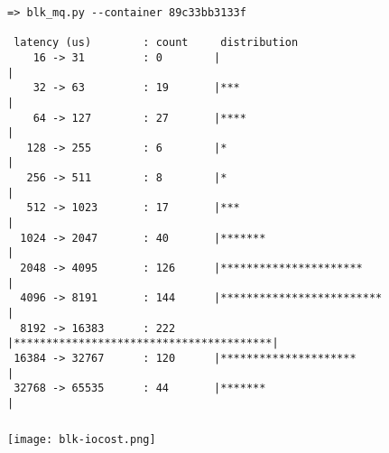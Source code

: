 \documentclass[usenames,dvipsnames, 18pt, compress, aspectratio=169]{beamer}
\begin{document}
\begin{frame}[fragile]{}
    \frametitle{}
    \begin{center}

        \begin{flushleft}
			\begin{verbatim}
=> blk_mq.py --container 89c33bb3133f

 latency (us)        : count     distribution
    16 -> 31         : 0        |                                        |
    32 -> 63         : 19       |***                                     |
    64 -> 127        : 27       |****                                    |
   128 -> 255        : 6        |*                                       |
   256 -> 511        : 8        |*                                       |
   512 -> 1023       : 17       |***                                     |
  1024 -> 2047       : 40       |*******                                 |
  2048 -> 4095       : 126      |**********************                  |
  4096 -> 8191       : 144      |*************************               |
  8192 -> 16383      : 222      |****************************************|
 16384 -> 32767      : 120      |*********************                   |
 32768 -> 65535      : 44       |*******                                 |

        \end{verbatim}
        \end{flushleft}

    \end{center}
\end{frame}

\begin{frame}[fragile]{}
    \frametitle{}
    \begin{center}

        \texttt{[image: blk-iocost.png]}

    \end{center}
\end{frame}


\end{document}
